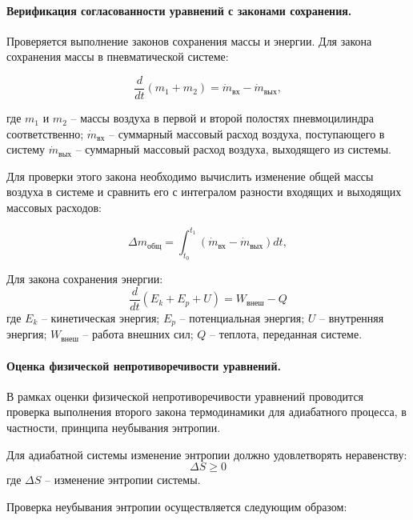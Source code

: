 \paragraph{Верификация согласованности уравнений с законами сохранения.}

Проверяется выполнение законов сохранения массы и энергии. Для закона сохранения массы в пневматической системе:

\begin{equation*}
    \frac{d}{dt}(m_1 + m_2) = \dot{m}_\text{вх} - \dot{m}_\text{вых},
\end{equation*}

где $m_1$ и $m_2$ -- массы воздуха в первой и второй полостях пневмоцилиндра соответственно;
$\dot{m}_\text{вх}$ -- суммарный массовый расход воздуха, поступающего в систему
$\dot{m}_\text{вых}$ -- суммарный массовый расход воздуха, выходящего из системы.

Для проверки этого закона необходимо вычислить изменение общей массы воздуха в системе и сравнить
его с интегралом разности входящих и выходящих массовых расходов:

\begin{equation*}
    \Delta m_\text{общ} = \int_{t_0}^{t_1} (\dot{m}_\text{вх} - \dot{m}_\text{вых}) dt,
\end{equation*}

Для закона сохранения энергии:
\begin{equation*}
    \frac{d}{dt}(E_k + E_p + U) = W_{\text{внеш}} - Q
\end{equation*}
где $E_k$ -- кинетическая энергия;
$E_p$ -- потенциальная энергия;
$U$ -- внутренняя энергия;
$W_{\text{внеш}}$ -- работа внешних сил;
$Q$ -- теплота, переданная системе.

\paragraph{Оценка физической непротиворечивости уравнений.}

В рамках оценки физической непротиворечивости уравнений проводится проверка
выполнения второго закона термодинамики для адиабатного процесса, в частности, принципа неубывания энтропии.

Для адиабатной системы изменение энтропии должно удовлетворять неравенству:
\begin{equation*}
    \Delta S \geq 0
\end{equation*}
где $\Delta S$ -- изменение энтропии системы.

Проверка неубывания энтропии осуществляется следующим образом:


